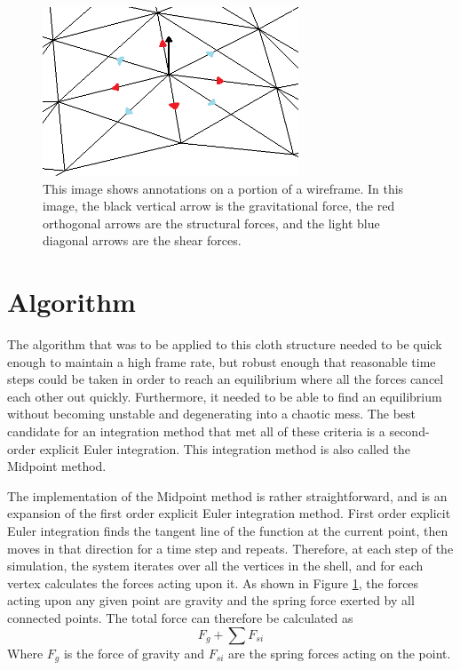\documentclass{thesis}
\begin{document}
\begin{figure}
\centering
\includegraphics[width=3in]{images/wireframe_detail.png}
\caption[Detail of a wireframe of a simulated model]{This image shows annotations on a portion of a wireframe.  In this image, the black
vertical arrow is the gravitational force, the red orthogonal arrows are the structural forces, and the light blue diagonal arrows are the
shear forces.}
\label{fig:wireframe_detail}
\end{figure}

\section{Algorithm}
The algorithm that was to be applied to this cloth structure needed to be quick enough to maintain a high frame rate, but robust enough
that reasonable time steps could be taken in order to reach an equilibrium where all the forces cancel each other out quickly.
Furthermore, it needed to be able to find an equilibrium without becoming unstable and degenerating into a chaotic mess.  The
best candidate for an integration method that met all of these criteria is a second-order explicit Euler integration.  This
integration method is also called the Midpoint method.

The implementation of the Midpoint method is rather straightforward, and is an expansion of the first order explicit Euler integration
method.  First order explicit Euler integration finds the tangent line of the function at the current point, then moves in that direction
for a time step and repeats.  Therefore, at each step of the simulation, the system iterates over all the vertices in the shell, and for
each vertex calculates the forces acting upon it.  As shown in Figure \ref{fig:wireframe_detail}, the forces acting upon any given point are
gravity and the spring force exerted by all connected points.  The total force can therefore be calculated as \[F_g+\sum{F_{si}}\]
Where $F_g$ is the force of gravity and $F_{si}$ are the spring forces acting on the point.
\end{document}
